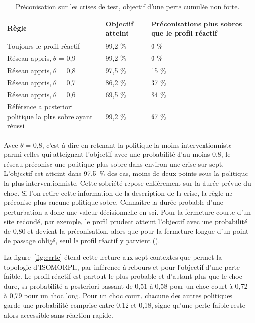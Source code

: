\begin{table}[htbp]
\caption{Préconisation sur les crises de test, objectif d'une perte cumulée non forte.}
\label{tab:d15}
\footnotesize
\begin{tabularx}{\textwidth}{@{}LLL@{}}
\toprule
\textbf{Règle} & \textbf{Objectif atteint} & \textbf{Préconisations plus sobres que le profil réactif} \\
\midrule
Toujours le profil réactif & 99,2 \% & 0 \% \\
Réseau appris, $\theta$ = 0,9 & 99,2 \% & 0 \% \\
Réseau appris, $\theta$ = 0,8 & 97,5 \% & 15 \% \\
Réseau appris, $\theta$ = 0,7 & 86,2 \% & 37 \% \\
Réseau appris, $\theta$ = 0,6 & 69,5 \% & 84 \% \\
Référence a posteriori : politique la plus sobre ayant réussi & 99,2 \% & 67 \% \\
\bottomrule
\end{tabularx}
\end{table}

Avec $\theta$ = 0,8, c'est-à-dire en retenant la politique la moins interventionniste parmi celles qui atteignent l'objectif avec une probabilité d'au moins 0,8, le réseau préconise une politique plus sobre dans environ une crise sur sept. L'objectif est atteint dans 97,5~\% des cas, moins de deux points sous la politique la plus interventionniste. Cette sobriété repose entièrement sur la durée prévue du choc. Si l'on retire cette information de la description de la crise, la règle ne préconise plus aucune politique sobre. Connaître la durée probable d'une perturbation a donc une valeur décisionnelle en soi. Pour la fermeture courte d'un site redondé, par exemple, le profil prudent atteint l'objectif avec une probabilité de 0,80 et devient la préconisation, alors que pour la fermeture longue d'un point de passage obligé, seul le profil réactif y parvient ().

La figure~\ref{fig:carte} étend cette lecture aux sept contextes que permet la topologie d'ISOMORPH, par inférence à rebours et pour l'objectif d'une perte faible. Le profil réactif est partout le plus probable et d'autant plus que le choc dure, sa probabilité a posteriori passant de 0,51 à 0,58 pour un choc court à 0,72 à 0,79 pour un choc long. Pour un choc court, chacune des autres politiques garde une probabilité comprise entre 0,12 et 0,18, signe qu'une perte faible reste alors accessible sans réaction rapide.

